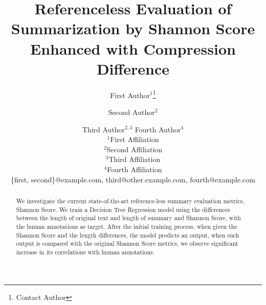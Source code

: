 \documentclass[11pt]{article}
\title{Referenceless Evaluation of Summarization by Shannon Score 
Enhanced with Compression Difference}
\author{
First Author$^1$\footnote{Contact Author}\and
Second Author$^2$\and
Third Author$^{2,3}$\And
Fourth Author$^4$\\
\affiliations
$^1$First Affiliation\\
$^2$Second Affiliation\\
$^3$Third Affiliation\\
$^4$Fourth Affiliation\\
\emails
\{first, second\}@example.com,
third@other.example.com,
fourth@example.com
}
\begin{document}
\maketitle

\begin{abstract}
We investigate the current state-of-the-art reference-less summary evaluation metrics, Shannon Score. We train a Decision Tree Regression model using the differences between the length of original text and length of summary and Shannon Score, with the human annotations as target. After the initial training process, when given the Shannon Score and the length differences, the model predicts an output, when such output is compared with the original Shannon Score metrics, we observe significant increase in its correlations with human annotations.
\end{abstract}









\end{document}

